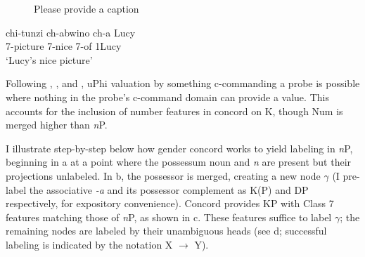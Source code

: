 \documentclass[output=paper
,modfonts
,nonflat]{langsci/langscibook}
\begin{document}
\begin{figure}
	\caption{\color{red}Please provide a caption\label{ex-carstens:28}}
	\begin{exe} 
	\end{exe}
	\end{figure}
\begin{exe}
 	\ex\label{ex-carstens:28c}
	\gll chi-tunzi    ch-abwino   ch-a Lucy\\
	7-picture   7-nice           7-of 1Lucy\\
	\glt `Lucy's nice picture' 
\end{exe}

Following \citet{Bejar_Rezac2009}, \citet{Toosarvandani_Van_Urk2014}, and \citet{Carstens2016}, uPhi valuation by something c-commanding a probe is possible where nothing in the probe’s c-command domain can provide a value. This accounts for the inclusion of number features in concord on K, though Num is merged higher than \textit{n}P.

I illustrate step-by-step below how gender concord works to yield labeling in \textit{n}P, beginning in a at a point where the possessum noun and \textit{n} are present but their projections unlabeled. In b, the possessor is merged, creating a new node $\gamma$ (I pre-label the associative \textit{-a} and its possessor complement as K(P) and DP respectively, for expository convenience). Concord provides KP with Class 7 features matching those of \textit{n}P, as shown in c. These features suffice to label $\gamma$;  the remaining nodes are labeled by their unambiguous heads (see d; successful labeling is indicated by the notation X $\rightarrow$ Y).
\end{document}
